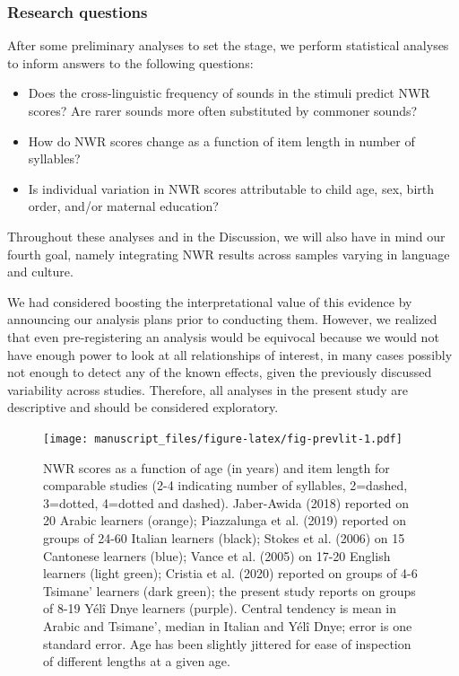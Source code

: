 \documentclass[english,,man,floatsintext]{apa6}
\providecommand{\tightlist}{%
  \setlength{\itemsep}{0pt}\setlength{\parskip}{0pt}}
\begin{document}
\hypertarget{research-questions}{%
\subsubsection{Research questions}\label{research-questions}}

After some preliminary analyses to set the stage, we perform statistical analyses to inform answers to the following questions:

\begin{itemize}
\tightlist
\item
  Does the cross-linguistic frequency of sounds in the stimuli predict NWR scores? Are rarer sounds more often substituted by commoner sounds?
\item
  How do NWR scores change as a function of item length in number of syllables?
\item
  Is individual variation in NWR scores attributable to child age, sex, birth order, and/or maternal education?
\end{itemize}

Throughout these analyses and in the Discussion, we will also have in mind our fourth goal, namely integrating NWR results across samples varying in language and culture.

We had considered boosting the interpretational value of this evidence by announcing our analysis plans prior to conducting them. However, we realized that even pre-registering an analysis would be equivocal because we would not have enough power to look at all relationships of interest, in many cases possibly not enough to detect any of the known effects, given the previously discussed variability across studies. Therefore, all analyses in the present study are descriptive and should be considered exploratory.

\begin{figure}
\centering
\texttt{[image: manuscript\_files/figure-latex/fig-prevlit-1.pdf]}
\caption{\label{fig:fig-prevlit}NWR scores as a function of age (in years) and item length for comparable studies (2-4 indicating number of syllables, 2=dashed, 3=dotted, 4=dotted and dashed). Jaber-Awida (2018) reported on 20 Arabic learners (orange); Piazzalunga et al. (2019) reported on groups of 24-60 Italian learners (black); Stokes et al. (2006) on 15 Cantonese learners (blue); Vance et al. (2005) on 17-20 English learners (light green); Cristia et al. (2020) reported on groups of 4-6 Tsimane' learners (dark green); the present study reports on groups of 8-19 Yélî Dnye learners (purple). Central tendency is mean in Arabic and Tsimane', median in Italian and Yélî Dnye; error is one standard error. Age has been slightly jittered for ease of inspection of different lengths at a given age.}
\end{figure}
\end{document}
